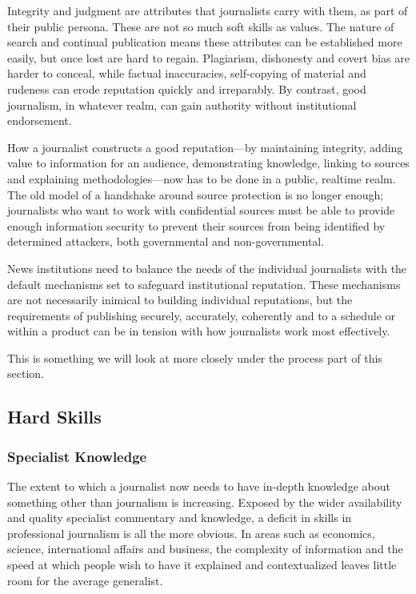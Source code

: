 Integrity and judgment are attributes that journalists carry with them, as part of
their public persona. These are not so much soft skills as values. The nature of
search and continual publication means these attributes can be established more
easily, but once lost are hard to regain. Plagiarism, dishonesty and covert bias are
harder to conceal, while factual inaccuracies, self-copying of material and rudeness
can erode reputation quickly and irreparably. By contrast, good journalism,
in whatever realm, can gain authority without institutional endorsement.

How a journalist constructs a good reputation—by maintaining integrity, adding
value to information for an audience, demonstrating knowledge, linking to
sources and explaining methodologies—now has to be done in a public, realtime
realm. The old model of a handshake around source protection is no longer
enough; journalists who want to work with confidential sources must be able to
provide enough information security to prevent their sources from being identified
by determined attackers, both governmental and non-governmental.

News institutions need to balance the needs of the individual journalists with the
default mechanisms set to safeguard institutional reputation. These mechanisms
are not necessarily inimical to building individual reputations, but the requirements
of publishing securely, accurately, coherently and to a schedule or within a
product can be in tension with how journalists work most effectively.

This is something we will look at more closely under the process part of
this section.

\subsection{Hard Skills}
\subsubsection{Specialist Knowledge}
The extent to which a journalist now needs to have in-depth knowledge about
something other than journalism is increasing. Exposed by the wider availability
and quality specialist commentary and knowledge, a deficit in skills in professional
journalism is all the more obvious. In areas such as economics, science,
international affairs and business, the complexity of information and the speed at
which people wish to have it explained and contextualized leaves little room for
the average generalist.

